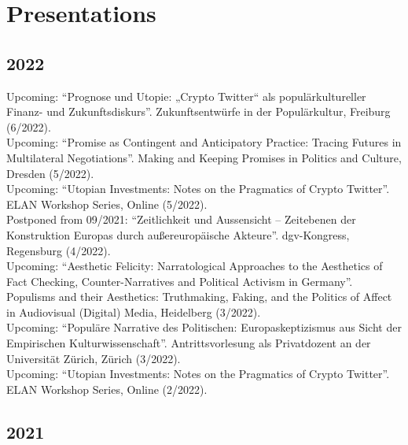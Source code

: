 \section*{Presentations}
\subsection*{2022}
Upcoming: \enquote{Prognose und Utopie: „Crypto Twitter“ als populärkultureller Finanz- und Zukunftsdiskurs}. Zukunftsentwürfe in der Populärkultur, Freiburg (6/2022).\\[.25cm]Upcoming: \enquote{Promise as Contingent and Anticipatory Practice: Tracing Futures in Multilateral Negotiations}. Making and Keeping Promises in Politics and Culture, Dresden (5/2022).\\[.25cm]Upcoming: \enquote{Utopian Investments: Notes on the Pragmatics of Crypto Twitter}. ELAN Workshop Series, Online (5/2022).\\[.25cm]Postponed from 09/2021: \enquote{Zeitlichkeit und Aussensicht – Zeitebenen der Konstruktion Europas durch außereuropäische Akteure}. dgv-Kongress, Regensburg (4/2022).\\[.25cm]Upcoming: \enquote{Aesthetic Felicity: Narratological Approaches to the Aesthetics of Fact Checking, Counter-Narratives and Political Activism in Germany}. Populisms and their Aesthetics: Truthmaking, Faking, and the Politics of Affect in Audiovisual (Digital) Media, Heidelberg (3/2022).\\[.25cm]Upcoming: \enquote{Populäre Narrative des Politischen: Europaskeptizismus aus Sicht der Empirischen Kulturwissenschaft}. Antrittsvorlesung als Privatdozent an der Universität Zürich, Zürich (3/2022).\\[.25cm]Upcoming: \enquote{Utopian Investments: Notes on the Pragmatics of Crypto Twitter}. ELAN Workshop Series, Online (2/2022).\subsection*{2021}
